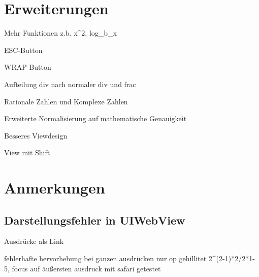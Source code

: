 \chapter{Erweiterungen}
\item Mehr Funktionen z.b. x^2, log_b_x
\item ESC-Button
\item WRAP-Button
\item Aufteilung div nach normaler div und frac
\item Rationale Zahlen und Komplexe Zahlen
\item Erweiterte Normalisierung auf mathematische Genauigkeit
\item Besseres Viewdesign
\item View mit Shift
\chapter{Anmerkungen}
\section{Darstellungsfehler in UIWebView}
	\item Ausdrücke als Link
	\item fehlerhafte hervorhebung bei ganzen ausdrücken
		nur op gehillitet
		2^(2-1)*2/2*1-5, focus auf äußersten ausdruck
		mit safari getestet
